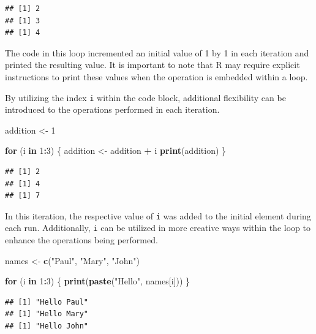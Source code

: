 \documentclass[
]{article}
\newenvironment{Shaded}{\begin{snugshade}}{\end{snugshade}}
\newcommand{\ControlFlowTok}[1]{\textcolor[rgb]{0.13,0.29,0.53}{\textbf{#1}}}
\newcommand{\DecValTok}[1]{\textcolor[rgb]{0.00,0.00,0.81}{#1}}
\newcommand{\FunctionTok}[1]{\textcolor[rgb]{0.13,0.29,0.53}{\textbf{#1}}}
\newcommand{\NormalTok}[1]{#1}
\newcommand{\OtherTok}[1]{\textcolor[rgb]{0.56,0.35,0.01}{#1}}
\newcommand{\SpecialCharTok}[1]{\textcolor[rgb]{0.81,0.36,0.00}{\textbf{#1}}}
\newcommand{\StringTok}[1]{\textcolor[rgb]{0.31,0.60,0.02}{#1}}
\begin{document}
\begin{verbatim}
## [1] 2
## [1] 3
## [1] 4
\end{verbatim}

The code in this loop incremented an initial value of 1 by 1 in each iteration and printed the resulting value. It is important to note that R may require explicit instructions to print these values when the operation is embedded within a loop.

By utilizing the index \texttt{i} within the code block, additional flexibility can be introduced to the operations performed in each iteration.

\begin{Shaded}
\begin{Highlighting}[]
\NormalTok{addition }\OtherTok{\textless{}{-}} \DecValTok{1}

\ControlFlowTok{for}\NormalTok{ (i }\ControlFlowTok{in} \DecValTok{1}\SpecialCharTok{:}\DecValTok{3}\NormalTok{)}
\NormalTok{\{}
\NormalTok{  addition }\OtherTok{\textless{}{-}}\NormalTok{ addition }\SpecialCharTok{+}\NormalTok{ i}
  \FunctionTok{print}\NormalTok{(addition)}
\NormalTok{\}}
\end{Highlighting}
\end{Shaded}

\begin{verbatim}
## [1] 2
## [1] 4
## [1] 7
\end{verbatim}

In this iteration, the respective value of \texttt{i} was added to the initial element during each run. Additionally, \texttt{i} can be utilized in more creative ways within the loop to enhance the operations being performed.

\begin{Shaded}
\begin{Highlighting}[]
\NormalTok{names }\OtherTok{\textless{}{-}} \FunctionTok{c}\NormalTok{(}\StringTok{"Paul"}\NormalTok{, }\StringTok{"Mary"}\NormalTok{, }\StringTok{"John"}\NormalTok{)}

\ControlFlowTok{for}\NormalTok{ (i }\ControlFlowTok{in} \DecValTok{1}\SpecialCharTok{:}\DecValTok{3}\NormalTok{)}
\NormalTok{\{}
  \FunctionTok{print}\NormalTok{(}\FunctionTok{paste}\NormalTok{(}\StringTok{"Hello"}\NormalTok{, names[i]))}
\NormalTok{\}}
\end{Highlighting}
\end{Shaded}

\begin{verbatim}
## [1] "Hello Paul"
## [1] "Hello Mary"
## [1] "Hello John"
\end{verbatim}
\end{document}
